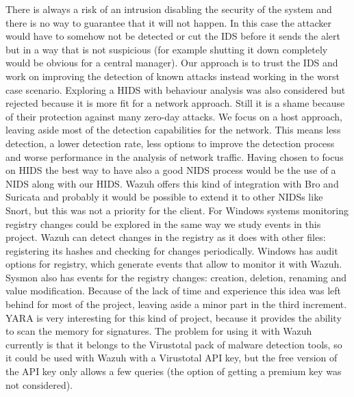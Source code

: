\linej
\linej
There is always a risk of an intrusion disabling the security of the system and there is no way to guarantee that it will not happen.
In this case the attacker would have to somehow not be detected or cut the IDS before it sends the alert but in a way that is not suspicious (for example shutting it down completely would be obvious for a central manager).
Our approach is to trust the IDS and work on improving the detection of known attacks instead working in the worst case scenario.
\linej
\linej
Exploring a HIDS with behaviour analysis was also considered but rejected because it is more fit for a network approach.
Still it is a shame because of their protection against many zero-day attacks.
\linej
\linej
We focus on a host approach, leaving aside most of the detection capabilities for the network. This means less detection, a lower detection rate, less options to improve the detection process and worse performance in the analysis of network traffic. Having chosen to focus on HIDS the best way to have also a good NIDS process would be the use of a NIDS along with our HIDS.
\linej
Wazuh offers this kind of integration with Bro and Suricata and probably it would be possible to extend it to other NIDSs like Snort, but this was not a priority for the client.
\linej
\linej
For Windows systems monitoring registry changes could be explored in the same way we study events in this project.
Wazuh can detect changes in the registry as it does with other files: registering its hashes and checking for changes periodically.
Windows has audit options for registry, which generate events that allow to monitor it with Wazuh.
Sysmon also has events for the registry changes: creation, deletion, renaming and value modification.
Because of the lack of time and experience this idea was left behind for most of the project, leaving aside a minor part in the third increment.
\linej
\linej
YARA is very interesting for this kind of project, because it provides the ability to scan the memory for signatures.
The problem for using it with Wazuh currently is that it belongs to the Virustotal pack of malware detection tools, so it could be used with Wazuh with a Virustotal API key, but the free version of the API key only allows a few queries (the option of getting a premium key was not considered).
